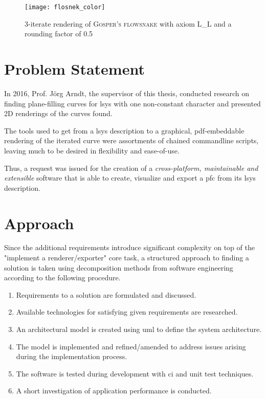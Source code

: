 \begin{figure}[hb]
	\centering
	\texttt{[image: flosnek\_color]}
	\caption{3-iterate rendering of \textsc{Gosper's flowsnake} with axiom \textrm{L\_L} and a rounding factor of 0.5}
\end{figure}

\section{Problem Statement}
In 2016, Prof. Jörg Arndt, the supervisor of this thesis, conducted research on finding plane-filling curves for \gls{lsys} with one non-constant character \citep{Arndt2016} and presented 2D renderings of the curves found.

The tools used to get from a \gls{lsys} description to a graphical, pdf-embeddable rendering of the iterated curve were assortments of chained commandline scripts, leaving much to be desired in flexibility and ease-of-use.

Thus, a request was issued for the creation of a \emph{cross-platform, maintainable and extensible} software that is able to create, visualize and export a \gls{pfc} from its \gls{lsys} description.

\section{Approach}
Since the additional requirements introduce significant complexity on top of the "implement a renderer/exporter" core task, a structured approach to finding a solution is taken using decomposition methods from software engineering according to the following procedure.
\begin{enumerate}
\item Requirements to a solution are formulated and discussed.
\item Available technologies for satisfying given requirements are researched.
\item An architectural model is created using \gls{uml} to define the system architecture.
\item The model is implemented and refined/amended to address issues arising during the implementation process.
\item The software is tested during development with \gls{ci} and \gls{unit test} techniques.
\item A short investigation of application performance is conducted.
\end{enumerate}

